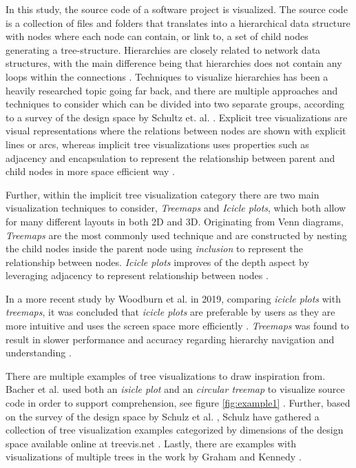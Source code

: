 In this study, the source code of a software project is visualized.
The source code is a collection of files and folders that translates into a hierarchical data structure with nodes where each node can contain, or link to, a set of child nodes generating a tree-structure.
Hierarchies are closely related to network data structures, with the main difference being that hierarchies does not contain any loops within the connections \cite{spence_information_2014}.
Techniques to visualize hierarchies has been a heavily researched topic going far back, and there are multiple approaches and techniques to consider which can be divided into two separate groups, according to a survey of the design space by Schultz et. al. \cite{schulz_design_2011}.
Explicit tree visualizations are visual representations where the relations between nodes are shown with explicit lines or arcs, whereas implicit tree visualizations uses properties such as adjacency and encapsulation to represent the relationship between parent and child nodes in more space efficient way \cite{schulz_design_2011}.

Further, within the implicit tree visualization category there are two main visualization techniques to consider, \textit{Treemaps} and \textit{Icicle plots}, which both allow for many different layouts in both 2D and 3D.
Originating from Venn diagrams, \textit{Treemaps} are the most commonly used technique and are constructed by nesting the child nodes inside the parent node using \textit{inclusion} to represent the relationship between nodes.
\textit{Icicle plots} improves of the depth aspect by leveraging adjacency to represent relationship between nodes \cite{schulz_design_2011}.

In a more recent study by Woodburn et al. in 2019, comparing \textit{icicle plots} with \textit{treemaps}, it was concluded that \textit{icicle plots} are preferable by users as they are more intuitive and uses the screen space more efficiently \cite{woodburn_interactive_2019}.
\textit{Treemaps} was found to result in slower performance and accuracy regarding hierarchy navigation and understanding \cite{woodburn_interactive_2019}.

% 


There are multiple examples of tree visualizations to draw inspiration from.
Bacher et al. used both an \textit{isicle plot} and an \textit{circular treemap} to visualize source code in order to support comprehension, see figure \ref{fig:example1} \cite{bacher_using_2016}.
Further, based on the survey of the design space by Schulz et al. \cite{schulz_design_2011}, Schulz have gathered a collection of tree visualization examples categorized by dimensions of the design space available online at treevis.net \cite{schulz_treevisnet_2011}.
Lastly, there are examples with visualizations of multiple trees in the work by Graham and Kennedy \cite{graham_survey_2010}.
